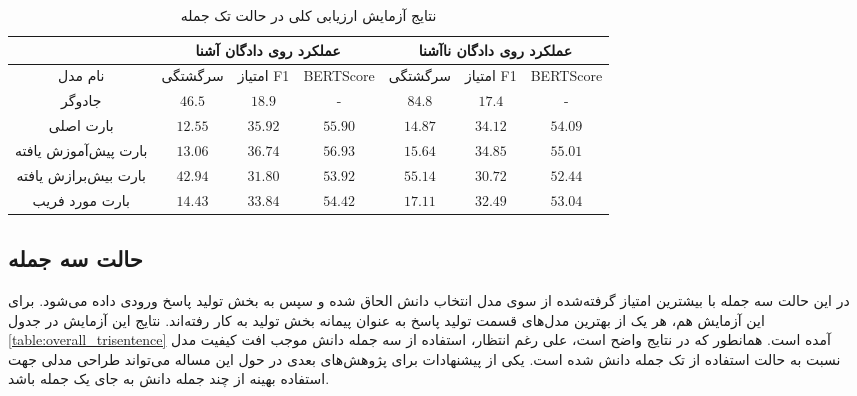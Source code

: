 \begin{table}[ht]
	\caption{نتایج آزمایش ارزیابی کلی در حالت تک جمله}
	\label{table:overall_unisentence}
	\begin{tabular}{|c|c|c|c|c|c|c|}
		\hline
		& \multicolumn{3}{c|}{عملکرد روی دادگان آشنا} & \multicolumn{3}{c|}{عملکرد روی دادگان نا‌آشنا} \\ \hline
		نام مدل              & سرگشتگی     & امتیاز F1     & BERTScore     & سرگشتگی      & امتیاز F1      & BERTScore      \\ \hline
		جادوگر               & $46.5$      & $18.9$        & -             & $84.8$       & $17.4$         & -              \\ \hline
		بارت اصلی            & $12.55$     & $35.92$       & $55.90$       & $14.87$      & $34.12$        & $54.09$        \\ \hline
		بارت پیش‌آموزش یافته & $13.06$     & $36.74$       & $56.93$       & $15.64$      & $34.85$        & $55.01$        \\ \hline
		بارت بیش‌برازش یافته & $42.94$     & $31.80$       & $53.92$       & $55.14$      & $30.72$        & $52.44$        \\ \hline
		بارت مورد فریب       & $14.43$     & $33.84$       & $54.42$       & $17.11$      & $32.49$        & $53.04$        \\ \hline
	\end{tabular}
\end{table}


\subsection{حالت سه جمله}
 در این حالت سه جمله با بیشترین امتیاز گرفته‌شده از سوی مدل انتخاب دانش
 الحاق شده و سپس  به بخش تولید پاسخ ورودی داده می‌شود. برای این آزمایش هم، هر یک از بهترین مدل‌های قسمت تولید پاسخ به عنوان پیمانه بخش تولید به کار رفته‌اند. نتایج این آزمایش در جدول 
 \ref{table:overall_trisentence} 
 آمده است. همانطور که در نتایج واضح است، علی رغم انتظار، استفاده از سه جمله دانش موجب افت کیفیت مدل نسبت به حالت استفاده از تک جمله دانش شده است. یکی از پیشنهادات برای پژوهش‌های بعدی در حول این مساله می‌تواند طراحی مدلی جهت استفاده بهینه از چند جمله دانش به جای یک جمله باشد. 
 
